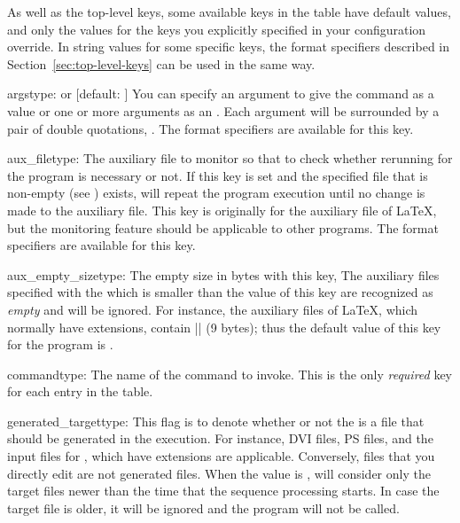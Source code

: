 \documentclass{llmk-doc}
\begin{document}
As well as the top-level keys, some available keys in the  table
have default values, and only the values for the keys you explicitly specified
in your configuration override. In string values for some specific keys, the
format specifiers described in Section~\ref{sec:top-level-keys} can be used in
the same way.

\begin{confkey}{args}{type:  or }
  [default: \code{["\%T"]}]
You can specify an argument to give the command as a  value or one
or more arguments as an . Each argument will be
surrounded by a pair of double quotations, \eg {}. The format
specifiers are available for this key.
\end{confkey}

\begin{confkey}{aux\_file}{type: }
The auxiliary file to monitor so that to check whether rerunning for the
program is necessary or not. If this key is set and the specified file that is
non-empty (see ) exists,  will repeat the
program execution until no change is made to the auxiliary file. This key is
originally for the auxiliary file of {\LaTeX}, but the monitoring feature
should be applicable to other programs. The format specifiers are available
for this key.
\end{confkey}

\begin{confkey}{aux\_empty\_size}{type: }
The empty size in bytes with this key, The auxiliary files specified with the
 which is smaller than the value of this key are recognized as
\emph{empty} and will be ignored. For instance, the auxiliary files of {\LaTeX},
which normally have  extensions, contain
|\textvisiblespace{}| (9 bytes); thus the default
value of this key for the  program is .
\end{confkey}

\begin{confkey}{command}{type: }
The name of the command to invoke. This is the only \emph{required} key for
each entry in the  table.
\end{confkey}

\begin{confkey}{generated\_target}{type: }
This flag is to denote whether or not the  is a file that should
be generated in the  execution. For instance, DVI files, PS files,
and the input files for , which have  extensions are
applicable. Conversely, files that you directly edit are not generated files.
When the value is ,  will consider only the target files
newer than the time that the sequence processing starts. In case the target
file is older, it will be ignored and the program will not be called.
\end{confkey}
\end{document}
